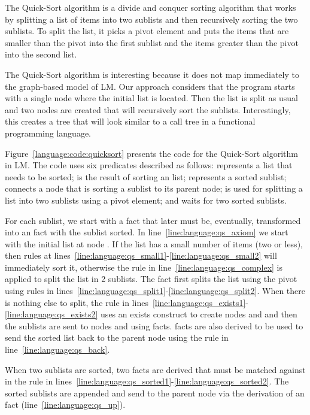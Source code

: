 The Quick-Sort algorithm is a divide and conquer sorting algorithm that works by
splitting a list of items into two sublists and then recursively sorting the two
sublists. To split the list, it picks a pivot element and puts the items that are
smaller than the pivot into the first sublist and the items greater than the pivot
into the second list.

The Quick-Sort algorithm is interesting because it does not map immediately to
the graph-based model of LM. Our approach considers that the program starts with
a single node where the initial list is located. Then the list is split as usual
and two nodes are created that will recursively sort the sublists.
Interestingly, this creates a tree that will look similar to a call tree in a
functional programming language.

Figure~\ref{language:code:quicksort} presents the code for the Quick-Sort
algorithm in LM. The code uses six predicates described as follows: 
represents a list that needs to be sorted;  is the result of sorting
an  list;  represents a sorted sublist; 
connects a node that is sorting a sublist to its parent node;  is
used for splitting a list into two sublists using a pivot element; and
 waits for two sorted sublists.

For each sublist, we start with a  fact that later
must be, eventually, transformed into an  fact with the sublist sorted.
In line~\ref{line:language:qs_axiom} we start with the initial list at node
. If the list has a small number of items (two or less), then rules at
lines~\ref{line:language:qs_small1}-\ref{line:language:qs_small2} will
immediately sort it, otherwise the rule in line~\ref{line:language:qs_complex}
is applied to split the list in 2 sublists. The fact  first splits
the list using the pivot  using rules in
lines~\ref{line:language:qs_split1}-\ref{line:language:qs_split2}.  When there
is nothing else to split, the rule in
lines~\ref{line:language:qs_exists1}-\ref{line:language:qs_exists2} uses an
exists construct to create nodes  and  and then the sublists are
sent to nodes  and  using  facts.   facts
are also derived to be used to send the sorted list back to the parent node
using the rule in line~\ref{line:language:qs_back}.

When two sublists are sorted, two  facts are derived that must be
matched against  in the rule in
lines~\ref{line:language:qs_sorted1}-\ref{line:language:qs_sorted2}. The sorted
sublists are appended and send  to the parent node via the derivation
of an  fact (line~\ref{line:language:qs_up}).

